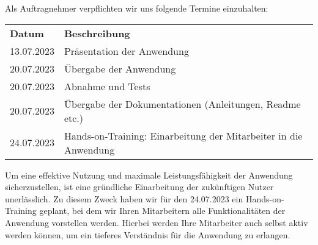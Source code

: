 Als Auftragnehmer verpflichten wir uns folgende Termine einzuhalten:

\begin{table} [H]
    \centering
    \begin{tabular}{l|l}
        \toprule
        \textbf{Datum} & \textbf{Beschreibung}                                    \\
        13.07.2023     & Präsentation der Anwendung                               \\
        20.07.2023     & Übergabe der Anwendung                                   \\
        20.07.2023     & Abnahme und Tests                                        \\
        20.07.2023     & Übergabe der Dokumentationen (Anleitungen, Readme etc.)          \\
        24.07.2023     & Hands-on-Training: Einarbeitung der Mitarbeiter in die Anwendung  \\
        \bottomrule
    \end{tabular}
\end{table}

Um eine effektive Nutzung und maximale Leistungsfähigkeit der Anwendung sicherzustellen, ist eine gründliche Einarbeitung der zukünftigen Nutzer unerlässlich.
Zu diesem Zweck haben wir für den 24.07.2023 ein Hands-on-Training geplant, bei dem wir Ihren Mitarbeitern alle Funktionalitäten der Anwendung vorstellen werden.
Hierbei werden Ihre Mitarbeiter auch selbst aktiv werden können, um ein tieferes Verständnis für die Anwendung zu erlangen.